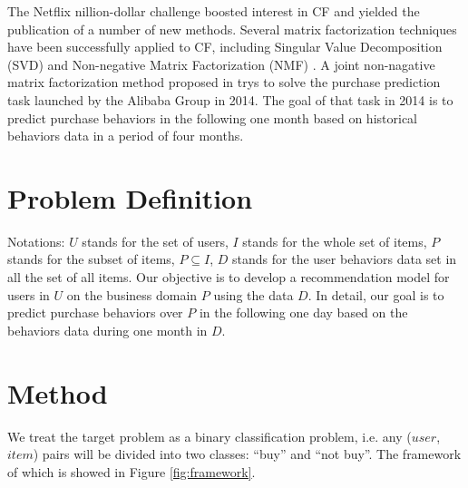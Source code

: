 \documentclass{llncs}
\begin{document}
The Netflix nillion-dollar challenge boosted interest in CF and yielded
the publication of a number of new methods.
Several matrix factorization techniques have been successfully applied to CF,
including Singular Value Decomposition (SVD) \cite{paterek2007improving}
and Non-negative Matrix Factorization (NMF) \cite{lee1999learning}.
A joint non-nagative matrix factorization method proposed in \cite{ju2014modeling}
trys to solve the purchase prediction task launched by the Alibaba Group in 2014.
The goal of that task in 2014 is to predict purchase behaviors in the following one month
based on historical behaviors data in a period of four months.

\section{Problem Definition}
Notations:
$U$ stands for the set of users,
$I$ stands for the whole set of items,
$P$ stands for the subset of items, $P \subseteq I$,
$D$ stands for the user behaviors data set in all the set of all items.
Our objective is to develop a recommendation model
for users in $U$ on the business domain $P$ using the data $D$.
In detail, our goal is to predict purchase behaviors over $P$
in the following one day based on the behaviors data during one month in $D$.

\section{Method}
We treat the target problem as a binary classification problem,
i.e. any ($user$, $item$) pairs will be divided into two classes:
``buy'' and ``not buy''.
The framework of which is showed in Figure \ref{fig:framework}.
\end{document}
